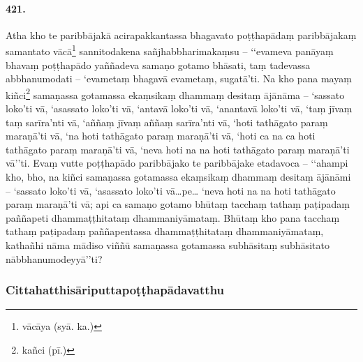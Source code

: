 \paragraph{421.} Atha kho te paribbājakā acirapakkantassa bhagavato poṭṭhapādaṃ paribbājakaṃ samantato vācā\footnote{vācāya (syā. ka.)} sannitodakena sañjhabbharimakaṃsu – ‘‘evameva panāyaṃ bhavaṃ poṭṭhapādo yaññadeva samaṇo gotamo bhāsati, taṃ tadevassa abbhanumodati – ‘evametaṃ bhagavā evametaṃ, sugatā’ti. Na kho pana mayaṃ kiñci\footnote{kañci (pī.)} samaṇassa gotamassa ekaṃsikaṃ dhammaṃ desitaṃ ājānāma – ‘sassato loko’ti vā, ‘asassato loko’ti vā, ‘antavā loko’ti vā, ‘anantavā loko’ti vā, ‘taṃ jīvaṃ taṃ sarīra’nti vā, ‘aññaṃ jīvaṃ aññaṃ sarīra’nti vā, ‘hoti tathāgato paraṃ maraṇā’ti vā, ‘na hoti tathāgato paraṃ maraṇā’ti vā, ‘hoti ca na ca hoti tathāgato paraṃ maraṇā’ti vā, ‘neva hoti na na hoti tathāgato paraṃ maraṇā’ti vā’’ti. Evaṃ vutte poṭṭhapādo paribbājako te paribbājake etadavoca – ‘‘ahampi kho, bho, na kiñci samaṇassa gotamassa ekaṃsikaṃ dhammaṃ desitaṃ ājānāmi – ‘sassato loko’ti vā, ‘asassato loko’ti vā…pe… ‘neva hoti na na hoti tathāgato paraṃ maraṇā’ti vā; api ca samaṇo gotamo bhūtaṃ tacchaṃ tathaṃ paṭipadaṃ paññapeti dhammaṭṭhitataṃ dhammaniyāmataṃ. Bhūtaṃ kho pana tacchaṃ tathaṃ paṭipadaṃ paññapentassa dhammaṭṭhitataṃ dhammaniyāmataṃ, kathañhi nāma mādiso viññū samaṇassa gotamassa subhāsitaṃ subhāsitato nābbhanumodeyyā’’ti?

\subsubsection{Cittahatthisāriputtapoṭṭhapādavatthu}

